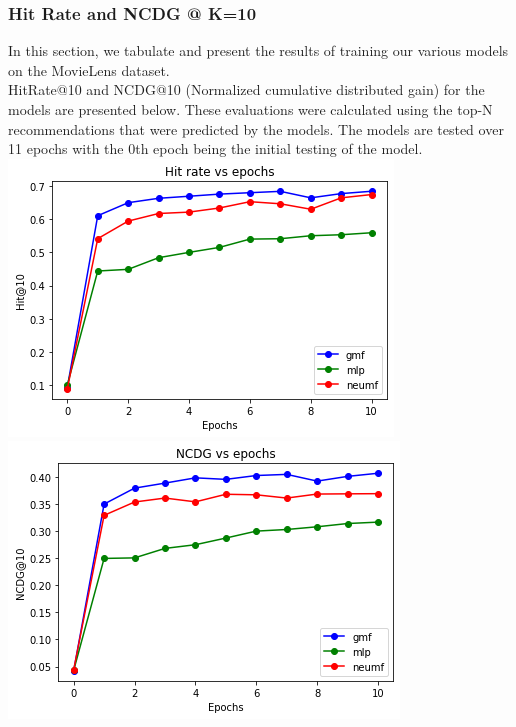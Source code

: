 \documentclass{article}
\begin{document}
\subsubsection{Hit Rate and NCDG @ K=10}
In this section, we tabulate and present the results of training our various models on the MovieLens dataset. \\
HitRate@10 and NCDG@10 (Normalized cumulative distributed gain) for the models are presented below. These evaluations were calculated using the top-N recommendations that were predicted by the models. The models are tested over 11 epochs with the 0th epoch being the initial testing of the model.\\
\includegraphics[scale=0.5]{hit_rate}
\includegraphics[scale=0.5]{ncdg}\\
\end{document}
